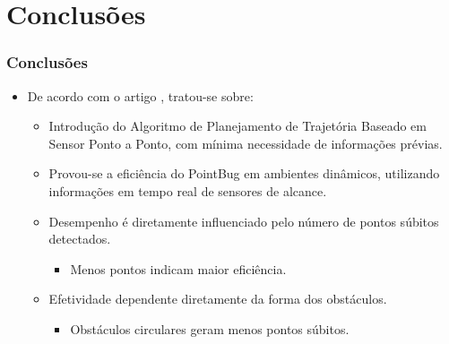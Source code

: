 \documentclass[xcolor=dvipsnames, aspectratio=169]{beamer}
\begin{document}
\section{Conclusões}
\begin{frame}[fragile]
  \frametitle{Conclusões}
  \begin{itemize}
    \item De acordo com o artigo \cite{buniyamin2011simple}, tratou-se sobre:
    \begin{itemize}
      \item Introdução do Algoritmo de Planejamento de Trajetória Baseado em Sensor Ponto a Ponto, com mínima necessidade de informações prévias.
      \item Provou-se a eficiência do PointBug em ambientes dinâmicos, utilizando informações em tempo real de sensores de alcance.
      \item Desempenho é diretamente influenciado pelo número de pontos súbitos detectados.
      \begin{itemize}
        \item Menos pontos indicam maior eficiência.
      \end{itemize}
      \item Efetividade dependente diretamente da forma dos obstáculos.
      \begin{itemize}
        \item Obstáculos circulares geram menos pontos súbitos.
      \end{itemize} 
    \end{itemize}

  \end{itemize}
\end{frame}

\begin{frame}
    \printbibliography
\end{frame}


\begin{frame}
\titlepage %
\end{frame}
\end{document}
